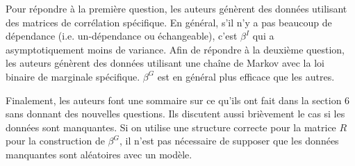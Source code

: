 \documentclass[../main.tex]{subfiles}
\begin{document}
Pour répondre à la première question, les auteurs génèrent des données utilisant des matrices de corrélation spécifique.
En général, s'il n'y a pas beaucoup de dépendance (i.e. un-dépendance ou échangeable), c'est $\beta^I$ qui a asymptotiquement
moins de variance. Afin de répondre à la deuxième question, 
les auteurs génèrent des données utilisant une chaîne de Markov avec la loi binaire de marginale spécifique. 
$\beta^G$ est en général plus efficace que les autres. 

Finalement, les auteurs font une sommaire sur ce qu'ils ont fait dans la section 6 sans donnant des nouvelles questions.
Ils discutent aussi brièvement le cas si les données sont manquantes.
Si on utilise une structure correcte pour la matrice $R$ pour la construction de $\beta^G$,
il n'est pas nécessaire de supposer que les données manquantes sont aléatoires avec un modèle.


\end{document}
